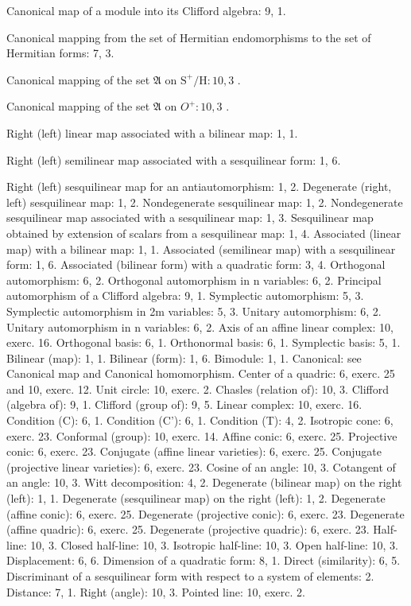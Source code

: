 Canonical map of a module into its Clifford algebra: 9, 1.

Canonical mapping from the set of Hermitian endomorphisms to the set of Hermitian forms: 7, 3.

Canonical mapping of the set \(\mathfrak{A}\) on \(\mathrm{S}^{+}/\mathrm{H}:10,3\) .

Canonical mapping of the set \(\mathfrak{A}\) on \(O^{+}:10,3\) .

Right (left) linear map associated with a bilinear map: 1, 1.

Right (left) semilinear map associated with a sesquilinear form: 1, 6.

Right (left) sesquilinear map for an antiautomorphism: 1, 2. Degenerate (right, left) sesquilinear map: 1, 2. Nondegenerate sesquilinear map: 1, 2. Nondegenerate sesquilinear map associated with a sesquilinear map: 1, 3. Sesquilinear map obtained by extension of scalars from a sesquilinear map: 1, 4. Associated (linear map) with a bilinear map: 1, 1. Associated (semilinear map) with a sesquilinear form: 1, 6. Associated (bilinear form) with a quadratic form: 3, 4. Orthogonal automorphism: 6, 2. Orthogonal automorphism in n variables: 6, 2. Principal automorphism of a Clifford algebra: 9, 1. Symplectic automorphism: 5, 3. Symplectic automorphism in 2m variables: 5, 3. Unitary automorphism: 6, 2. Unitary automorphism in n variables: 6, 2. Axis of an affine linear complex: 10, exerc. 16. Orthogonal basis: 6, 1. Orthonormal basis: 6, 1. Symplectic basis: 5, 1. Bilinear (map): 1, 1. Bilinear (form): 1, 6. Bimodule: 1, 1. Canonical: see Canonical map and Canonical homomorphism. Center of a quadric: 6, exerc. 25 and 10, exerc. 12. Unit circle: 10, exerc. 2. Chasles (relation of): 10, 3. Clifford (algebra of): 9, 1. Clifford (group of): 9, 5. Linear complex: 10, exerc. 16. Condition (C): 6, 1. Condition (C'): 6, 1. Condition (T): 4, 2. Isotropic cone: 6, exerc. 23. Conformal (group): 10, exerc. 14. Affine conic: 6, exerc. 25. Projective conic: 6, exerc. 23. Conjugate (affine linear varieties): 6, exerc. 25. Conjugate (projective linear varieties): 6, exerc. 23. Cosine of an angle: 10, 3. Cotangent of an angle: 10, 3. Witt decomposition: 4, 2. Degenerate (bilinear map) on the right (left): 1, 1. Degenerate (sesquilinear map) on the right (left): 1, 2. Degenerate (affine conic): 6, exerc. 25. Degenerate (projective conic): 6, exerc. 23. Degenerate (affine quadric): 6, exerc. 25. Degenerate (projective quadric): 6, exerc. 23. Half-line: 10, 3. Closed half-line: 10, 3. Isotropic half-line: 10, 3. Open half-line: 10, 3. Displacement: 6, 6. Dimension of a quadratic form: 8, 1. Direct (similarity): 6, 5. Discriminant of a sesquilinear form with respect to a system of elements: 2. Distance: 7, 1. Right (angle): 10, 3. Pointed line: 10, exerc. 2.


